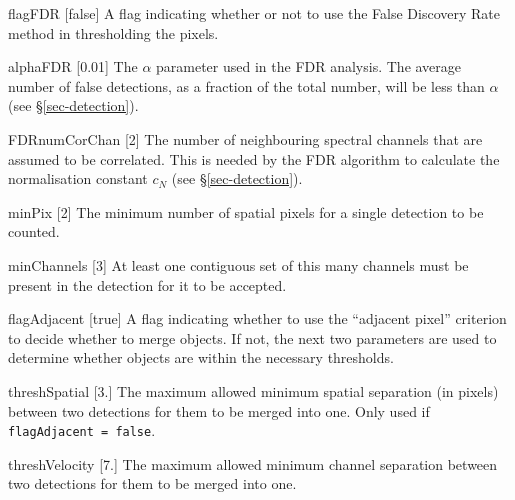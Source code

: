\begin{Lentry}
\item[{flagFDR [false]}] A flag indicating whether or not to use
  the False Discovery Rate method in thresholding the pixels.
\item[{alphaFDR [0.01]}] The $\alpha$ parameter used in the FDR
  analysis. The average number of false detections, as a fraction of
  the total number, will be less than $\alpha$ (see
  \S\ref{sec-detection}).
\item[{FDRnumCorChan [2]}] The number of neighbouring spectral
  channels that are assumed to be correlated. This is needed by the
  FDR algorithm to calculate the normalisation constant $c_N$ (see
  \S\ref{sec-detection}). 
\end{Lentry}

\begin{Lentry}
\item[{minPix [2]}] The minimum number of spatial pixels for a
  single detection to be counted.
\item[{minChannels [3]}] At least one contiguous set of this many
  channels must be present in the detection for it to be accepted.
\item[{flagAdjacent [true]}] A flag indicating whether to use
  the ``adjacent pixel'' criterion to decide whether to merge
  objects. If not, the next two parameters are used to determine
  whether objects are within the necessary thresholds.
\item[{threshSpatial [3.]}] The maximum allowed minimum spatial
  separation (in pixels) between two detections for them to be merged
  into one. Only used if \texttt{flagAdjacent = false}.
\item[{threshVelocity [7.]}] The maximum allowed minimum channel
  separation between two detections for them to be merged into
  one. 
\end{Lentry}

